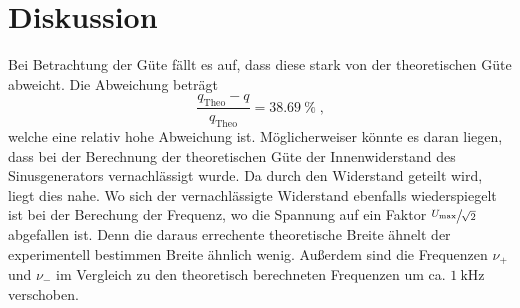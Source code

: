 \section{Diskussion}
\label{sec:Diskussion}
Bei Betrachtung der Güte fällt es auf, dass diese stark von der theoretischen  Güte abweicht.
Die Abweichung beträgt
\begin{equation}
    \frac{ q_\text{Theo} - q}{q_\text{Theo}} = \SI{38.69}{\percent} \; \text{,}
\end{equation}
welche eine relativ hohe Abweichung ist. 
Möglicherweiser könnte es daran liegen, dass bei der Berechnung der theoretischen Güte der Innenwiderstand des
Sinusgenerators vernachlässigt wurde. 
Da durch den Widerstand geteilt wird, liegt dies nahe.
Wo sich der vernachlässigte Widerstand ebenfalls wiederspiegelt ist bei der Berechung der Frequenz, wo die Spannung auf ein Faktor 
$\sfrac{U_\text{max}}{\sqrt{2}}$ abgefallen ist. Denn die daraus errechente theoretische Breite ähnelt der experimentell bestimmen Breite ähnlich wenig.
Außerdem sind die Frequenzen $\nu_+$ und $\nu_-$ im Vergleich zu den theoretisch berechneten Frequenzen um ca. $\SI{1}{\kilo\hertz}$ verschoben.